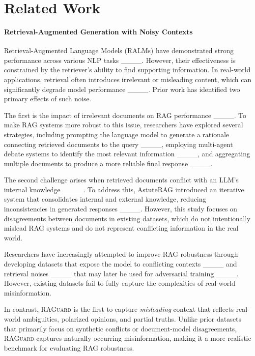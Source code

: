 \section{Related Work}
\paragraph{Retrieval-Augmented Generation with Noisy Contexts}
Retrieval-Augmented Language Models (RALMs) have demonstrated strong performance across various NLP tasks ____. However, their effectiveness is constrained by the retriever’s ability to find supporting information. In real-world applications, retrieval often introduces irrelevant or misleading content, which can significantly degrade model performance ____. Prior work has identified two primary effects of such noise.

The first is the impact of irrelevant documents on RAG performance ____. To make RAG systems more robust to this issue, researchers have explored several strategies, including prompting the language model to generate a rationale connecting retrieved documents to the query ____, employing multi-agent debate systems to identify the most relevant information ____, and aggregating multiple documents to produce a more reliable final response ____.

The second challenge arises when retrieved documents conflict with an LLM’s internal knowledge ____. To address this, AstuteRAG introduced an iterative system that consolidates internal and external knowledge, reducing inconsistencies in generated responses ____. However, this study focuses on disagreements between documents in existing datasets, which do not intentionally mislead RAG systems and do not represent conflicting information in the real world.

Researchers have increasingly attempted to improve RAG robustness through developing datasets that expose the model to conflicting contexts ____ and retrieval noises ____ that may later be used for adversarial training ____. However, existing datasets fail to fully capture the complexities of real-world misinformation. 


In contrast, \textsc{RAGuard} is the first to capture \textit{misleading} context that reflects real-world ambiguities, polarized opinions, and partial truths. Unlike prior datasets that primarily focus on synthetic conflicts or document-model disagreements, \textsc{RAGuard} captures naturally occurring misinformation, making it a more realistic benchmark for evaluating RAG robustness. 

